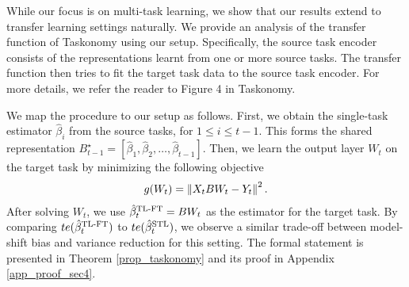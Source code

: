 While our focus is on multi-task learning, we show that our results extend to transfer learning settings naturally.
We provide an analysis of the transfer function of Taskonomy \cite{ZSSGM18} using our setup.
Specifically, the source task encoder consists of the representations learnt from one or more source tasks.
The transfer function then tries to fit the target task data to the source task encoder.
For more details, we refer the reader to Figure 4 in Taskonomy.

We map the procedure to our setup as follows.
First, we obtain the single-task estimator $\hat{\beta}_i$ from the source tasks, for $1\le i \le t-1$.
This forms the shared representation $B^{\star}_{t-1} = [\hat{\beta}_1,\hat{\beta}_2,\dots,\hat{\beta}_{t-1}]$.
Then, we learn the output layer $W_t$ on the target task by minimizing the following objective
\begin{align}
	g(W_t) = \left\| X_t B W_t - Y_t \right\|^2.
\end{align}
After solving $W_t$, we use $\hat{\beta}_t^{\text{TL-FT}} = B W_t$ as the estimator for the target task.
By comparing $te(\hat{\beta}_t^{\text{TL-FT}})$ to $te(\hat{\beta}_t^{\text{STL}})$, we observe a similar trade-off between model-shift bias and variance reduction for this setting.
The formal statement is presented in Theorem \ref{prop_taskonomy} and its proof in Appendix \ref{app_proof_sec4}.
